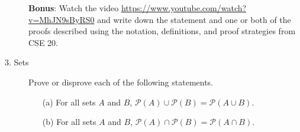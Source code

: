 \documentclass[12pt, oneside]{article}
\newif \ifsolution
\newcommand{\soltwo}[1]{\medskip\fbox{\begin{minipage}{6.5in}{#1}\end{minipage}}\medskip}
\begin{document}
\begin{description}
\begin{enumerate}
  \end{enumerate}
  
  {\bf Bonus}: Watch the video \url{https://www.youtube.com/watch?v=MhJN9sByRS0} and write
  down the statement and one or both of the proofs described using the notation, definitions, and 
  proof strategies from CSE 20. 

  \item[3. Sets]  Prove or disprove each of the following statements.
  \begin{enumerate}
  \item[(a)]  For all sets $A$ and $B$, $\mathcal{P}(A) \cup \mathcal{P}(B) = \mathcal{P}(A \cup B)$.
  
  \ifsolution
  \soltwo{
  False.  A counterexample would be $A = \{1\}, B = \{2\}$.  Then 
  \[
  \mathcal{P}(A) \cup \mathcal{P}(B) = \{ \emptyset, \{1\} \} \cup \{ \emptyset , \{2\} \} = 
  \{ \emptyset, \{1\}, \{2\} \}
  \]
  but
  \[
  \mathcal{P}(A \cup B) = \mathcal{P}(\{1,2\}) = \{ \emptyset, \{1\}, \{2\}, \{1,2\} \}.
  \]
  These sets are not equal because they disagree about membership of $\{1,2\}$.
  }
  \else{}
  \fi
  
  \item[(b)] For all sets $A$ and $B$, $\mathcal{P}(A) \cap \mathcal{P}(B) = \mathcal{P}(A \cap B)$.
  
  \ifsolution
  \soltwo{
  True.  Proof: let $A, B$ be arbitrary sets.  We WTS that 
  $\mathcal{P}(A) \cap \mathcal{P}(B) \subseteq \mathcal{P}(A \cap B)$
  and $\mathcal{P}(A \cap B) \subseteq \mathcal{P}(A) \cap \mathcal{P}(B)$.
  \begin{itemize}
  \item[(c)] For the first subset inclusion, consider arbitrary $X \in \mathcal{P}(A) \cap \mathcal{P}(B)$.
  By definition of intersection, $X\in \mathcal{P}(A)$ and $X \in \mathcal{P}(B)$.
  By definition of power set, this means that $X \subseteq A$ and $X \subseteq B$.
  WTS that $X \subseteq A \cap B$: let $x \in X$.  Since $X \subseteq A$, $x \in A$.
  Since $X \subseteq B$, $x \in B$.  Thus, $x \in A$ and $x \in B$ so $x \in A \cap B$.
  Since $x$ was arbitrary, $\forall x ( x \in X \to x \in A \cap B)$ so $X \subseteq A \cap B$.
  Therefore, by definition of power set $X \in \mathcal{P}(A \cap B)$, as required.
  
  \item[(d)] For the second subset inclusion, consider arbitrary $X \in \mathcal{P}(A \cap B)$.  
  By definition of power set, $X \subseteq (A \cap B)$.  WTS that $X \subseteq A$ and 
  $X \subseteq B$.  Let $x \in X$.  Then by definition of subsets, $x \in A \cap B$. 
  By definition of intersection, $x \in A$ and $x \in B$.  Thus $X \subseteq A$ and 
  $X \subseteq B$ and so by definition of power set, $X \in \mathcal{P}(A)$
  and $X \in \mathcal{P}(B)$.  By definition of intersection, $X \in \mathcal{P}(A) \cap 
  \mathcal{P}(B)$, 
  as required.
  \end{itemize}
  }
  \else{}
  \fi
  

\end{enumerate}
\end{description}
\end{document}
